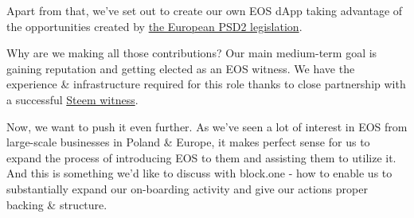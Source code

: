 \documentclass[10pt,a4paper,dateno,sigleft]{newlfm} %
\begin{document}
\begin{newlfm}
Apart from that, we've set out to create our own EOS dApp taking advantage of the opportunities created by \href{https://www.evry.com/en/news/articles/psd2-the-directive-that-will-change-banking-as-we-know-it/}{the European PSD2 legislation}.

Why are we making all those contributions? Our main medium-term goal is gaining reputation and getting elected as an EOS witness. We have the experience \& infrastructure required for this role thanks to close partnership with a successful \href{https://steemit.com/@gtg}{Steem witness}.

Now, we want to push it even further. As we've seen a lot of interest in EOS from large-scale businesses in Poland \& Europe, it makes perfect sense for us to expand the process of introducing EOS to them and assisting them to utilize it. And this is something we'd like to discuss with block.one - how to enable us to substantially expand our on-boarding activity and give our actions proper backing \& structure.


\end{newlfm}
\end{document}
